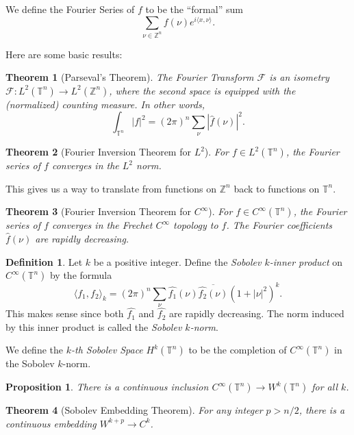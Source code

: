 \documentclass[12pt, reqno]{extarticle}
\theoremstyle{plain}
\newtheorem{theorem}{Theorem}[section]
\newtheorem{proposition}{Proposition}[section]
\theoremstyle{definition}
\newtheorem{definition}{Definition}[section]
\theoremstyle{remark}
\newcommand{\ZZ}{\mathbb{Z}}
\newcommand{\TT}{\mathbb{T}}
\begin{document}
We define the Fourier Series of $f$ to be the ``formal'' sum
\[
    \sum_{\nu \in \ZZ^n}f(\nu)e^{i\langle x, \nu\rangle}.
\]

Here are some basic results:

\begin{theorem}[Parseval's Theorem]
    The Fourier Transform $\mathcal{F}$ is an isometry $\mathcal{F}: L^2(\TT^n) \to L^2(\ZZ^n)$,
    where the second space is equipped with the (normalized) counting measure. In other words,
    \[
        \int_{\TT^n}|f|^2 = (2\pi)^n\sum_{\nu}|\widehat{f}(\nu)|^2.
    \]
\end{theorem}

\begin{theorem}[Fourier Inversion Theorem for $L^2$]
    For $f \in L^2(\TT^n)$, the Fourier series of $f$ converges in the $L^2$ norm.
\end{theorem}

This gives us a way to translate from functions on $\ZZ^n$ back to functions on $\TT^n$. 

\begin{theorem}[Fourier Inversion Theorem for $C^\infty$]
    For $f \in C^\infty(\TT^n)$, the Fourier series of $f$ converges in the Frechet $C^\infty$
    topology to $f$. The Fourier coefficients $\widehat{f}(\nu)$ are rapidly decreasing.
\end{theorem}

\begin{definition}
    Let $k$ be a positive integer. Define the \textit{Sobolev $k$-inner product} on $C^\infty(\TT^n)$
    by the formula
    \[
        \langle f_1, f_2\rangle_k = (2\pi)^n \sum_{\nu}\widehat{f_1}(\nu)\overline{\widehat{f_2}(\nu)}
        (1 + |\nu|^2)^k.
    \]
    This makes sense since both $\widehat{f_1}$ and $\widehat{f_2}$ are rapidly decreasing. 
    The norm induced by this inner product is called the \textit{Sobolev $k$-norm}.

    We define the \textit{$k$-th Sobolev Space} $H^k(\TT^n)$ to be the completion of 
    $C^\infty(\TT^n)$ in the Sobolev $k$-norm.
\end{definition}

\begin{proposition}
    There is a continuous inclusion $C^\infty(\TT^n) \to W^k(\TT^n)$ for all $k$.
\end{proposition}

\begin{theorem}[Sobolev Embedding Theorem]
    For any integer $p > n/2$, there is a continuous embedding $W^{k + p} \to C^k$.
\end{theorem}
\end{document}
